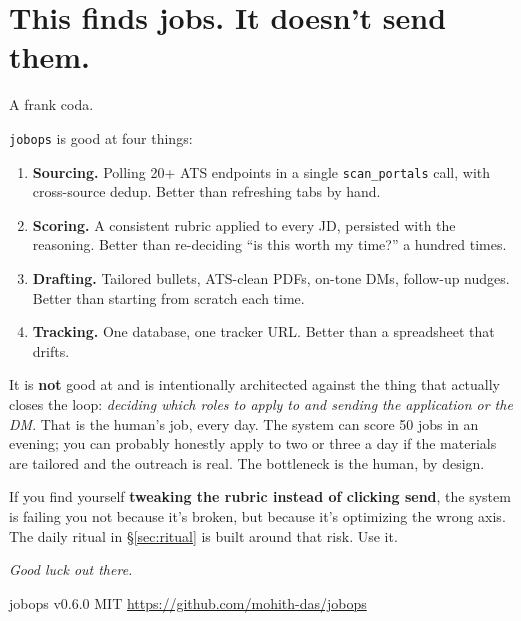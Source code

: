 \documentclass[11pt,letterpaper]{article}
\newcommand{\pkg}{\texttt{jobops}}
\newcommand{\tool}[1]{\texttt{#1}}
\begin{document}
\section{This finds jobs. It doesn't send them.}\label{sec:honest}

A frank coda.

\pkg{} is good at four things:

\begin{enumerate}
\item \textbf{Sourcing.} Polling 20+ ATS endpoints in a single \tool{scan\_portals} call, with cross-source dedup. Better than refreshing tabs by hand.
\item \textbf{Scoring.} A consistent rubric applied to every JD, persisted with the reasoning. Better than re-deciding ``is this worth my time?'' a hundred times.
\item \textbf{Drafting.} Tailored bullets, ATS-clean PDFs, on-tone DMs, follow-up nudges. Better than starting from scratch each time.
\item \textbf{Tracking.} One database, one tracker URL. Better than a spreadsheet that drifts.
\end{enumerate}

It is \textbf{not} good at \textemdash{} and is intentionally architected against \textemdash{} the thing that actually closes the loop: \textit{deciding which roles to apply to and sending the application or the DM}. That is the human's job, every day. The system can score 50 jobs in an evening; you can probably honestly apply to two or three a day if the materials are tailored and the outreach is real. The bottleneck is the human, by design.

If you find yourself \textbf{tweaking the rubric instead of clicking send}, the system is failing you \textemdash{} not because it's broken, but because it's optimizing the wrong axis. The daily ritual in \S\ref{sec:ritual} is built around that risk. Use it.

\bigskip\bigskip

\begin{center}
\textit{Good luck out there.}
\end{center}

\vfill
\begin{flushright}
\small\color{black!50}\sffamily
jobops \textbullet{} v0.6.0 \textbullet{} MIT \textbullet{} \url{https://github.com/mohith-das/jobops}
\end{flushright}
\end{document}
